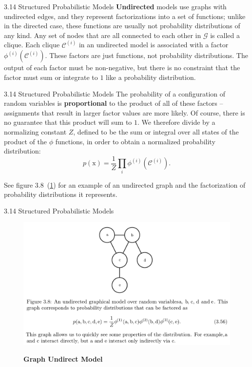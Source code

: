 \begin{frame}{3.14 Structured Probabilistic Models}
    \justifying
    \textbf{Undirected} models use graphs with undirected edges, and they represent factorizations into a set of functions; unlike in the directed case, these functions are usually not probability distributions of any kind. Any set of nodes that are all connected to each other in $\mathcal{G}$ is called a clique. Each clique $\mathcal{C}^{(i)}$ in an undirected model is associated with a factor $\phi^{(i)}(\mathcal{C}^{(i)})$. These factors are just functions, not probability distributions. The output of each factor must be non-negative, but there is no constraint that the factor must sum or integrate to $1$ like a probability distribution.
\end{frame}

\begin{frame}{3.14 Structured Probabilistic Models}
    \justifying
    The probability of a configuration of random variables is \textbf{proportional} to the product of all of these factors -- assignments that result in larger factor values are more likely. Of course, there is no guarantee that this product will sum to $1$. We therefore divide by a normalizing constant $Z$, defined to be the sum or integral over all states of the product of the $\phi$ functions, in order to obtain a normalized probability distribution:
    \begin{equation}
        p(\boldsymbol{\mathrm{x}}) = \frac{1}{Z}\prod_{i}\phi^{(i)}\left(\mathcal{C}^{(i)}\right).
        \label{eq:3_55}
    \end{equation}
    
    See figure 3.8~(\ref{fig:3_8graph2}) for an example of an undirected graph and the factorization of probability distributions it represents.
\end{frame}

\begin{frame}{3.14 Structured Probabilistic Models}
    \begin{figure}
        \centering
        \includegraphics[scale=0.3]{images/3-8-graph_2.png}
        \label{fig:3_8graph2}
        \caption{\textbf{Graph Undirect Model}}
    \end{figure}
\end{frame}

